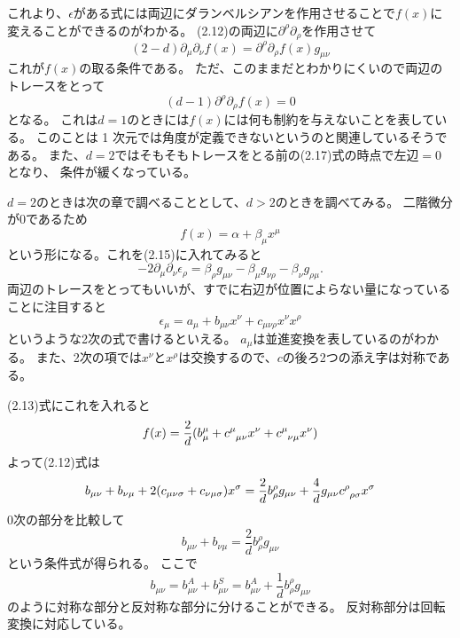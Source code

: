 \documentclass[../../master.tex]{subfiles}
\begin{document}
これより、\(\epsilon\)がある式には両辺にダランベルシアンを作用させることで\(f(x)\)に変えることができるのがわかる。
(2.12)の両辺に\(\partial^\rho\partial_\rho\)を作用させて
\begin{equation}
    (2-d)\partial_\mu\partial_\nu f(x) = \partial^\rho\partial_\rho f(x) g_{\mu\nu}
\end{equation}
これが\(f(x)\)の取る条件である。
ただ、このままだとわかりにくいので両辺のトレースをとって
\begin{equation}
    (d-1)\partial^\rho\partial_\rho f(x) =0
\end{equation}
となる。
これは\(d=1\)のときには\(f(x)\)には何も制約を与えないことを表している。
このことは 1 次元では角度が定義できないというのと関連しているそうである。
また、\(d=2\)ではそもそもトレースをとる前の(2.17)式の時点で左辺\(=0\)となり、
条件が緩くなっている。

\(d=2\)のときは次の章で調べることとして、\(d>2\)のときを調べてみる。
二階微分が\(0\)であるため
\begin{equation*}
    f(x) = \alpha + \beta_\mu x^\mu
\end{equation*}
という形になる。これを(2.15)に入れてみると
\begin{equation*}
    -2\partial_\mu\partial_\nu\epsilon_\rho = \beta_\rho g_{\mu\nu} - \beta_\mu g_{\nu\rho} -\beta_\nu g_{\rho\mu}.
\end{equation*}
両辺のトレースをとってもいいが、すでに右辺が位置によらない量になっていることに注目すると
\begin{equation}
    \epsilon_\mu = a_\mu + b_{\mu\nu}x^\nu + c_{\mu\nu\rho}x^\nu x^\rho
\end{equation}
というような2次の式で書けるといえる。
\(a_\mu\)は並進変換を表しているのがわかる。
また、2次の項では\(x^\nu\)と\(x^\rho\)は交換するので、\(c\)の後ろ2つの添え字は対称である。

(2.13)式にこれを入れると
\begin{equation*}
    f(x) = \frac{2}{d}(b_\mu^\mu+c\indices{^{\mu}_{\mu\nu}} x^\nu+c\indices{^{\mu}_{\nu\mu}} x^\nu)
\end{equation*}
よって(2.12)式は
\begin{equation*}
    b_{\mu\nu}+b_{\nu\mu}+ 2(c_{\mu\nu\sigma}+c_{\nu\mu\sigma})x^\sigma
    =\frac{2}{d}b_\rho^\rho g_{\mu\nu}+\frac{4}{d}g_{\mu\nu}c\indices{^{\rho}_{\rho\sigma}} x^\sigma
\end{equation*}
0次の部分を比較して
\begin{equation}
    b_{\mu\nu}+b_{\nu\mu} = \frac{2}{d}b_\rho^\rho g_{\mu\nu}
\end{equation}
という条件式が得られる。
ここで
\[
    b_{\mu\nu}=b_{\mu\nu}^A+b_{\mu\nu}^S=b_{\mu\nu}^A+\frac{1}{d}b_{\rho}^{\rho} g_{\mu\nu}
\]
のように対称な部分と反対称な部分に分けることができる。
反対称部分は回転変換に対応している。
\end{document}
